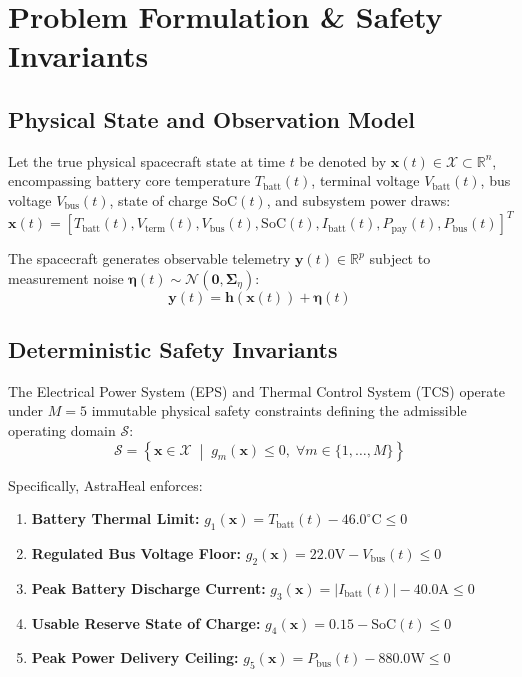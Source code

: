 \documentclass[10pt,twocolumn]{article}
\begin{document}
\section{Problem Formulation \& Safety Invariants}

\subsection{Physical State and Observation Model}
Let the true physical spacecraft state at time $t$ be denoted by $\mathbf{x}(t) \in \mathcal{X} \subset \mathbb{R}^n$, encompassing battery core temperature $T_{\text{batt}}(t)$, terminal voltage $V_{\text{batt}}(t)$, bus voltage $V_{\text{bus}}(t)$, state of charge $\text{SoC}(t)$, and subsystem power draws:
\begin{equation}
\mathbf{x}(t) = \left[ T_{\text{batt}}(t), V_{\text{term}}(t), V_{\text{bus}}(t), \text{SoC}(t), I_{\text{batt}}(t), P_{\text{pay}}(t), P_{\text{bus}}(t) \right]^T
\end{equation}

The spacecraft generates observable telemetry $\mathbf{y}(t) \in \mathbb{R}^p$ subject to measurement noise $\boldsymbol{\eta}(t) \sim \mathcal{N}(\mathbf{0}, \boldsymbol{\Sigma}_{\eta})$:
\begin{equation}
\mathbf{y}(t) = \mathbf{h}(\mathbf{x}(t)) + \boldsymbol{\eta}(t)
\end{equation}

\subsection{Deterministic Safety Invariants}
The Electrical Power System (EPS) and Thermal Control System (TCS) operate under $M=5$ immutable physical safety constraints defining the admissible operating domain $\mathcal{S}$:
\begin{equation}
\mathcal{S} = \left\{ \mathbf{x} \in \mathcal{X} \;\middle|\; g_m(\mathbf{x}) \le 0, \;\forall m \in \{1, \dots, M\} \right\}
\end{equation}

Specifically, AstraHeal enforces:
\begin{enumerate}
    \item \textbf{Battery Thermal Limit:} $g_1(\mathbf{x}) = T_{\text{batt}}(t) - 46.0^\circ\text{C} \le 0$
    \item \textbf{Regulated Bus Voltage Floor:} $g_2(\mathbf{x}) = 22.0\text{V} - V_{\text{bus}}(t) \le 0$
    \item \textbf{Peak Battery Discharge Current:} $g_3(\mathbf{x}) = |I_{\text{batt}}(t)| - 40.0\text{A} \le 0$
    \item \textbf{Usable Reserve State of Charge:} $g_4(\mathbf{x}) = 0.15 - \text{SoC}(t) \le 0$
    \item \textbf{Peak Power Delivery Ceiling:} $g_5(\mathbf{x}) = P_{\text{bus}}(t) - 880.0\text{W} \le 0$
\end{enumerate}
\end{document}
